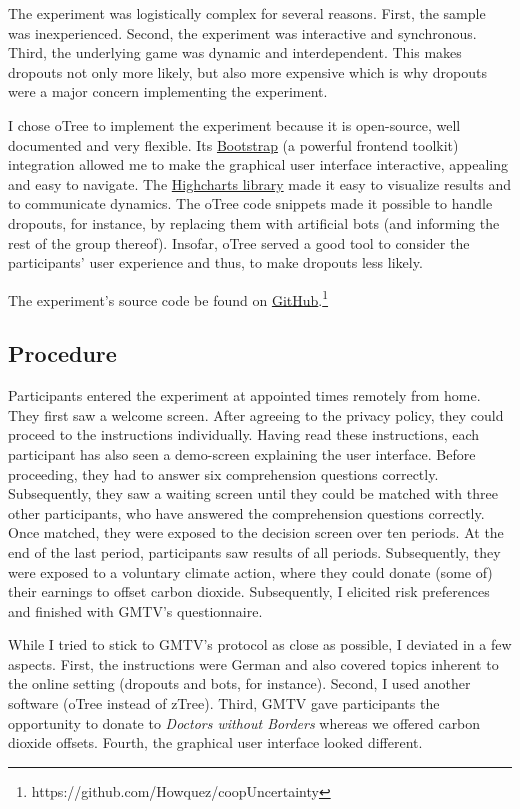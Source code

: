 \documentclass[
  authoryear,
  preprint,
  3p]{elsarticle}
\begin{document}
The experiment was logistically complex for several reasons. First, the
sample was inexperienced. Second, the experiment was interactive and
synchronous. Third, the underlying game was dynamic and interdependent.
This makes dropouts not only more likely, but also more expensive which
is why dropouts were a major concern implementing the experiment.

I chose oTree \citep{oTree} to implement the experiment because it is
open-source, well documented and very flexible. Its
\href{https://getbootstrap.com/}{Bootstrap} (a powerful frontend
toolkit) integration allowed me to make the graphical user interface
interactive, appealing and easy to navigate. The
\href{https://www.highcharts.com/}{Highcharts library} made it easy to
visualize results and to communicate dynamics. The oTree code snippets
made it possible to handle dropouts, for instance, by replacing them
with artificial bots (and informing the rest of the group thereof).
Insofar, oTree served a good tool to consider the participants' user
experience and thus, to make dropouts less likely.

The experiment's source code be found on
\href{https://github.com/Howquez/coopUncertainty}{GitHub}.\footnote{https://github.com/Howquez/coopUncertainty}

\hypertarget{sec-procedure}{%
\subsection{Procedure}\label{sec-procedure}}

Participants entered the experiment at appointed times remotely from
home. They first saw a welcome screen. After agreeing to the privacy
policy, they could proceed to the instructions individually. Having read
these instructions, each participant has also seen a demo-screen
explaining the user interface. Before proceeding, they had to answer six
comprehension questions correctly. Subsequently, they saw a waiting
screen until they could be matched with three other participants, who
have answered the comprehension questions correctly. Once matched, they
were exposed to the decision screen over ten periods. At the end of the
last period, participants saw results of all periods. Subsequently, they
were exposed to a voluntary climate action, where they could donate
(some of) their earnings to offset carbon dioxide. Subsequently, I
elicited risk preferences \citep{HoltLaury2002} and finished with GMTV's
questionnaire.

While I tried to stick to GMTV's protocol as close as possible, I
deviated in a few aspects. First, the instructions were German and also
covered topics inherent to the online setting (dropouts and bots, for
instance). Second, I used another software (oTree instead of zTree).
Third, GMTV gave participants the opportunity to donate to \emph{Doctors
without Borders} whereas we offered carbon dioxide offsets. Fourth, the
graphical user interface looked different.
\end{document}

